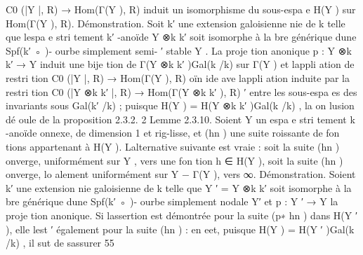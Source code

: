\documentclass[
  10pt,
]{article}
\newenvironment{Shaded}{}{}
\newcommand{\NormalTok}[1]{#1}
\begin{document}
\begin{Shaded}
\begin{Highlighting}[]
\NormalTok{                                   C0 (|Y |, R) → Hom(Γ(Y ), R)}
\NormalTok{induit un isomorphisme du sous{-}espa e H(Y ) sur Hom(Γ(Y ), R).}
\NormalTok{Démonstration. Soit k′ une extension galoisienne nie de k telle que l\textquotesingle{}espa e stri tement}
\NormalTok{k′ {-}anoïde Y ⊗k k′ soit isomorphe à la bre générique d\textquotesingle{}une Spf(k′ ◦ ){-} ourbe simplement semi{-}}
\NormalTok{                                                                                            ′}
\NormalTok{stable Y . La proje tion anonique p : Y ⊗k k′ → Y induit une bije tion de Γ(Y ⊗k k′ )Gal(k /k)}
\NormalTok{sur Γ(Y ) et l\textquotesingle{}appli ation de restri tion}
\NormalTok{                                   C0 (|Y |, R) → Hom(Γ(Y ), R)}
\NormalTok{ oïn ide ave l\textquotesingle{}appli ation induite par la restri tion}
\NormalTok{                            C0 (|Y ⊗k k′ |, R) → Hom(Γ(Y ⊗k k′ ), R)}
\NormalTok{                                                                                           ′}
\NormalTok{entre les sous{-}espa es des invariants sous Gal(k′ /k) ; puisque H(Y ) = H(Y ⊗k k′ )Gal(k /k) , la}
\NormalTok{ on lusion dé oule de la proposition 2.3.2.                                                    2}
\NormalTok{Lemme 2.3.10.  Soient Y un espa e stri tement k {-}anoïde onnexe, de dimension 1 et}
\NormalTok{rig{-}lisse, et (hn ) une suite roissante de fon tions appartenant à H(Y ). L\textquotesingle{}alternative suivante}
\NormalTok{est vraie :}
\NormalTok{    soit la suite (hn ) onverge, uniformément sur Y , vers une fon tion h ∈ H(Y ),}
\NormalTok{    soit la suite (hn ) onverge, lo alement uniformément sur Y − Γ(Y ), vers ∞.}
\NormalTok{Démonstration. Soient k′ une extension nie galoisienne de k telle que Y ′ = Y ⊗k k′ soit}
\NormalTok{isomorphe à la bre générique d\textquotesingle{}une Spf(k′ ◦ ){-} ourbe simplement nodale Y′ et p : Y ′ → Y la}
\NormalTok{proje tion anonique. Si l\textquotesingle{}assertion est démontrée pour la suite (p∗ hn ) dans H(Y ′ ), elle l\textquotesingle{}est}
\NormalTok{                                                                      ′}
\NormalTok{également pour la suite (hn ) : en eet, puisque H(Y ) = H(Y ′ )Gal(k /k) , il sut de s\textquotesingle{}assurer}
\NormalTok{                                                                                               55}




\end{Highlighting}
\end{Shaded}
\end{document}
